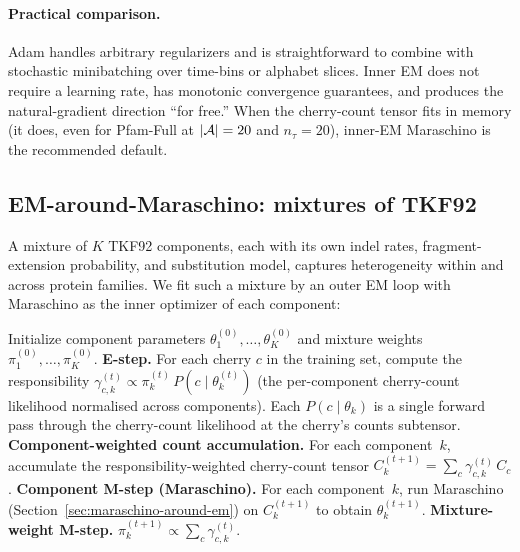 \paragraph{Practical comparison.}
Adam handles arbitrary regularizers and is straightforward to
combine with stochastic minibatching over time-bins or alphabet
slices.  Inner EM does not require a learning rate, has monotonic
convergence guarantees, and produces the natural-gradient direction
``for free.''  When the cherry-count tensor fits in memory (it does,
even for Pfam-Full at $|\mathcal{A}|=20$ and $n_\tau=20$), inner-EM
Maraschino is the recommended default.

\subsection{EM-around-Maraschino: mixtures of TKF92}
\label{sec:em-around-maraschino}

A mixture of $K$ TKF92 components, each with its own indel rates,
fragment-extension probability, and substitution model, captures
heterogeneity within and across protein families.  We fit such a
mixture by an outer EM loop with Maraschino as the inner optimizer
of each component:
\begin{algorithm}
\caption{EM-around-Maraschino for a mixture of $K$ TKF92 components.}
\label{alg:em-around-maraschino}
\begin{algorithmic}[1]
\State Initialize component parameters $\theta^{(0)}_1,\ldots,\theta^{(0)}_K$
       and mixture weights $\pi^{(0)}_1,\ldots,\pi^{(0)}_K$.
  \State \textbf{E-step.} For each cherry $c$ in the training set,
         compute the responsibility $\gamma^{(t)}_{c,k}
         \propto \pi^{(t)}_k\,P(c\mid \theta^{(t)}_k)$
         (the per-component cherry-count likelihood normalised across
         components).  Each $P(c\mid\theta_k)$ is a single forward pass
         through the cherry-count likelihood at the cherry's
         counts subtensor.
  \State \textbf{Component-weighted count accumulation.}
         For each component~$k$, accumulate the
         responsibility-weighted cherry-count tensor
         $C_k^{(t+1)} = \sum_c \gamma^{(t)}_{c,k}\,C_c$.
  \State \textbf{Component M-step (Maraschino).}
         For each component~$k$, run Maraschino
         (Section~\ref{sec:maraschino-around-em}) on $C_k^{(t+1)}$
         to obtain $\theta^{(t+1)}_k$.
  \State \textbf{Mixture-weight M-step.}
         $\pi^{(t+1)}_k \propto \sum_c \gamma^{(t)}_{c,k}$.
\EndFor
\end{algorithmic}
\end{algorithm}

